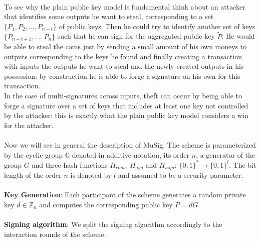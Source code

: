\\
To see why the plain public key model is fundamental think about an attacker that identifies some outputs he want to steal, corresponding to a set $\{P_1, P_2, ..., P_{n - t}\}$ of public keys. Then he could try to identify another set of keys $\{P_{n - t + 1}, ..., P_n\}$ such that he can sign for the aggregated public key $\tilde{P}$. He would be able to steal the coins just by sending a small amount of his own moneys to outputs corresponding to the keys he found and finally creating a transaction with inputs the outputs he want to steal and the newly created outputs in his possession: by construction he is able to forge a signature on his own for this transaction. 
\\
In the case of multi-signatures across inputs, theft can occur by being able to forge a signature over a set of keys that includes at least one key not controlled by the attacker: this is exactly what the plain public key model considers a win for the attacker.
\\
\\
Now we will see in general the description of MuSig. The scheme is parameterized by the cyclic group $\mathbb{G}$ denoted in additive notation, its order $n$, a generator of the group $G$ and three hash functions $H_{com}, \ H_{agg}$ and $H_{sign}$: $\{0, 1\}^* \to \{0, 1\}^l$. The bit length of the order $n$ is denoted by $l$ and assumed to be a security parameter.
\\
\\
{\bf Key Generation}: Each participant of the scheme generates a random private key $d \in \mathbb{Z}_n$ and computes  the corresponding public key $P = dG$.
\\
\\
{\bf Signing algorithm}:  We split the signing algorithm accordingly to the interaction rounds of the scheme.
